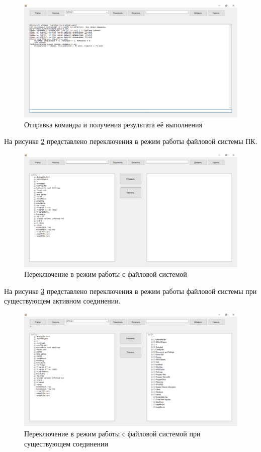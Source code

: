 \begin{figure}
	\centering
	\includegraphics[width=1\linewidth]{"images/6"}
	\caption{Отправка команды и получения результата её выполнения}
	\label{6:image}
\end{figure}

На рисунке \ref{7:image} представлено переключения в режим работы файловой системы ПК.
\begin{figure}
	\centering
	\includegraphics[width=1\linewidth]{"images/7"}
	\caption{Переключение в режим работы с файловой системой}
	\label{7:image}
\end{figure}

На рисунке \ref{8:image} представлено переключения в режим работы файловой системы при существующем активном соединении.

\begin{figure}
	\centering
	\includegraphics[width=1\linewidth]{"images/8"}
	\caption{Переключение в режим работы с файловой системой при существующем соединении}
	\label{8:image}
\end{figure}

